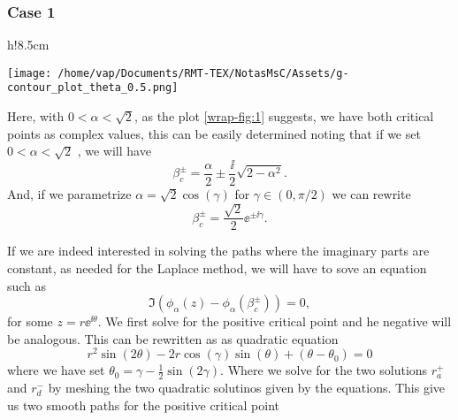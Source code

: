 \subsubsection{Case 1 }

\begin{wrapfigure}{h!}{8.5cm}
	\caption{Figure for Case 1}\label{wrap-fig:1}
	\texttt{[image: /home/vap/Documents/RMT-TEX/NotasMsC/Assets/g-contour\_plot\_theta\_0.5.png]}
\end{wrapfigure} 

Here, with $0 < \alpha < \sqrt{2}$, as the plot \ref{wrap-fig:1} suggests, we have both critical points as complex values, this can be easily determined noting that if we set $0 < \alpha < \sqrt{2}$ , we will have
\[ \beta_c^\pm  = \frac{\alpha}{2} \pm \frac{\ii}{2}\sqrt{2 -\alpha^2}.\]
And, if we parametrize $\alpha = \sqrt{2} \cos{(\gamma)}$ for $\gamma \in (0, \pi/2)$ we can rewrite 
\[ \beta_c^\pm = \frac{\sqrt{2}}{2} \ee^{\pm \ii \gamma}.\]

If we are indeed interested in solving the paths where the imaginary parts are constant, as needed for the Laplace method, we will have to sove an equation such as 
\[ \Im(\phi_{\alpha}(z) - \phi_{\alpha}(\beta_c^\pm)) = 0,\] 
for some $z = r \ee^{\ii \theta}$. We first solve for the positive critical point and he negative will be analogous. This can be rewritten as  as quadratic equation 
\[ r^2 \sin{(2\theta)} - 2r \cos{(\gamma)}\sin{(\theta)} + (\theta - \theta_0) = 0\]
where we have set $\theta_0 = \gamma - \frac{1}{2} \sin{(2\gamma)}.$ Where we solve for the two solutions $r_a^+$ and $r_d^-$  by meshing the two quadratic solutinos given by the equations. This give us two smooth paths for the positive critical point

